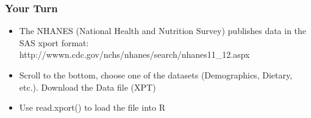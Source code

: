 \documentclass{beamer}\usepackage[]{graphicx}\usepackage[]{color}
\begin{document}
\begin{frame}
\frametitle{Your Turn}
\begin{itemize}
\item The NHANES (National Health and Nutrition Survey) publishes data in the SAS xport format:
http://wwwn.cdc.gov/nchs/nhanes/search/nhanes11\_12.aspx
\item Scroll to the bottom, choose one of the datasets (Demographics, Dietary, etc.). Download the Data file (XPT)
\item Use read.xport() to load the file into R
\end{itemize}
\end{frame}
\end{document}
